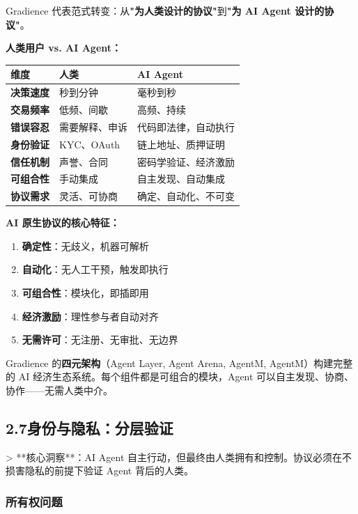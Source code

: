 \documentclass[11pt,a4paper]{article}
\begin{document}
Gradience 代表范式转变：从\textbf{"为人类设计的协议"}到\textbf{"为 AI Agent 设计的协议"}。

\textbf{人类用户 vs. AI Agent：}

\begin{table}[H]\centering
\begin{tabular}{@{}lll@{}}
\toprule
\textbf{维度} & \textbf{人类} & \textbf{AI Agent} \\
\midrule
\textbf{决策速度} & 秒到分钟 & 毫秒到秒 \\
\textbf{交易频率} & 低频、间歇 & 高频、持续 \\
\textbf{错误容忍} & 需要解释、申诉 & 代码即法律，自动执行 \\
\textbf{身份验证} & KYC、OAuth & 链上地址、质押证明 \\
\textbf{信任机制} & 声誉、合同 & 密码学验证、经济激励 \\
\textbf{可组合性} & 手动集成 & 自主发现、自动集成 \\
\textbf{协议需求} & 灵活、可协商 & 确定、自动化、不可变 \\
\bottomrule
\end{tabular}
\end{table}

\textbf{AI 原生协议的核心特征：}

\begin{enumerate}[leftmargin=2em]
\item \textbf{确定性}：无歧义，机器可解析
\item \textbf{自动化}：无人工干预，触发即执行
\item \textbf{可组合性}：模块化，即插即用
\item \textbf{经济激励}：理性参与者自动对齐
\item \textbf{无需许可}：无注册、无审批、无边界
\end{enumerate}

Gradience 的\textbf{四元架构}（Agent Layer, Agent Arena, AgentM, AgentM）构建完整的 AI 经济生态系统。每个组件都是可组合的模块，Agent 可以自主发现、协商、协作——无需人类中介。

\subsection{2.7\quad 身份与隐私：分层验证}

> **核心洞察**：AI Agent 自主行动，但最终由人类拥有和控制。协议必须在不损害隐私的前提下验证 Agent 背后的人类。

\subsubsection{所有权问题}
\end{document}
